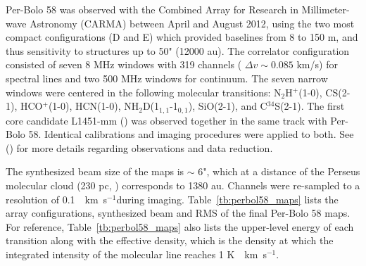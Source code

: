 \documentclass[iop]{emulateapj}
\newcommand{\kms}{\,~km~s$^{-1}$}
\newcommand{\nhtd}{\mbox{\rm NH$_2$D(1$_{1,1}$-1$_{0,1}$)}}
\newcommand{\nthp}{\mbox{\rm N$_2$H$^+$(1-0)}}
\newcommand{\hcn}{\mbox{\rm HCN(1-0)}}
\newcommand{\hcop}{\mbox{\rm  HCO$^+$(1-0)}}
\newcommand{\cs}{\mbox{\rm CS(2-1)}}
\begin{document}
Per-Bolo 58 was observed with the Combined Array for Research in Millimeter-wave Astronomy (CARMA) between April and August 2012, using the two most compact configurations (D and E) which provided baselines from 8 to 150 m, and thus sensitivity to structures up to 50" (12000 au). The correlator configuration consisted of seven 8 MHz windows with 319 channels ( $\Delta v \sim 0.085$ km/s) for spectral lines and two 500 MHz windows for continuum. The seven narrow windows were centered in the following molecular transitions: \nthp, \cs, \hcop, \hcn, \nhtd, SiO(2-1), and C$^{34}$S(2-1). The first core candidate L1451-mm (\citealt{2017MaureiraKinematics}) was observed together in the same track with Per-Bolo 58. Identical calibrations and imaging procedures were applied to both. See (\citealt{2017MaureiraKinematics}) for more details regarding observations and data reduction.

The synthesized beam size of the maps is $\sim$ 6", which at a distance of the Perseus molecular cloud (230 pc, \citealt{2008HirotaAstrometry}) corresponds to 1380 au. Channels were re-sampled to a resolution of 0.1 \kms during imaging.  Table~\ref{tb:perbol58_maps} lists the array configurations, synthesized beam and RMS of the final Per-Bolo 58 maps. For reference, Table~\ref{tb:perbol58_maps} also lists the upper-level energy of each transition along with the effective density, which is the density at which the integrated intensity of the molecular line reaches 1 K \kms.
\end{document}
